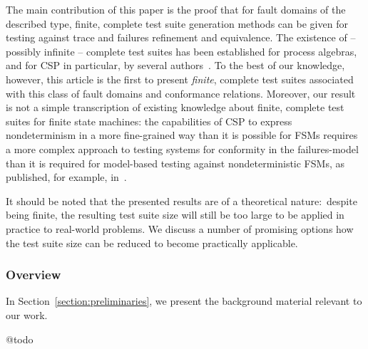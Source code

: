 The main contribution of this paper is the proof that for fault domains of
the described type, finite, complete test suite generation methods can be
given for testing against trace and failures refinement and equivalence. The
existence of -- possibly infinite -- complete test suites has been
established for process algebras, and for CSP in particular, by several
authors~\cite{Hennessy:1988:ATP:50497,Schneider:1995:OST:203471.203475,DBLP:conf/fm/PeleskaS96,peleska1997a,DBLP:conf/pts/CavalcantiS17}.
To the best of our knowledge, however, this article is the first to present
{\it finite}, complete test suites associated with this class of fault
domains and conformance relations. Moreover, our result is not a simple transcription of
existing knowledge  about finite, complete test suites for finite state machines:
the capabilities of CSP to express nondeterminism in a more fine-grained way than it is possible for FSMs requires a more complex approach to testing systems for conformity in the failures-model than it is required for model-based testing against nondeterministic FSMs, as published, for example, in~\cite{hierons_testing_2004,DBLP:conf/hase/PetrenkoY14}.



It should be noted that the presented results are of a theoretical
nature:~despite being finite, the resulting test suite size will still be too
large to be applied in practice to real-world problems. We discuss a number
of promising options how the test suite size can be reduced to become
practically applicable.


\subsubsection*{Overview}
In Section~\ref{section:preliminaries},
we present the background material relevant to our work.

@todo


